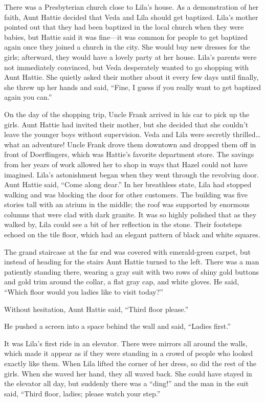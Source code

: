 \documentclass[
  american,
  letterpaper,
]{book}
\begin{document}
There was a Presbyterian church close to Lila's house. As a
demonstration of her faith, Aunt Hattie decided that Veda and Lila
should get baptized. Lila's mother pointed out that they had been
baptized in the local church when they were babies, but Hattie said it
was fine---it was common for people to get baptized again once they
joined a church in the city. She would buy new dresses for the girls;
afterward, they would have a lovely party at her house. Lila's parents
were not immediately convinced, but Veda desperately wanted to go
shopping with Aunt Hattie. She quietly asked their mother about it every
few days until finally, she threw up her hands and said, ``Fine, I guess
if you really want to get baptized again you can.''

On the day of the shopping trip, Uncle Frank arrived in his car to pick
up the girls. Aunt Hattie had invited their mother, but she decided that
she couldn't leave the younger boys without supervision. Veda and Lila
were secretly thrilled\ldots what an adventure! Uncle Frank drove them
downtown and dropped them off in front of Doerflingers, which was
Hattie's favorite department store. The savings from her years of work
allowed her to shop in ways that Hazel could not have imagined. Lila's
astonishment began when they went through the revolving door. Aunt
Hattie said, ``Come along dear.'' In her breathless state, Lila had
stopped walking and was blocking the door for other customers. The
building was five stories tall with an atrium in the middle; the roof
was supported by enormous columns that were clad with dark granite. It
was so highly polished that as they walked by, Lila could see a bit of
her reflection in the stone. Their footsteps echoed on the tile floor,
which had an elegant pattern of black and white squares.

The grand staircase at the far end was covered with emerald-green
carpet, but instead of heading for the stairs Aunt Hattie turned to the
left. There was a man patiently standing there, wearing a gray suit with
two rows of shiny gold buttons and gold trim around the collar, a flat
gray cap, and white gloves. He said, ``Which floor would you ladies like
to visit today?''

Without hesitation, Aunt Hattie said, ``Third floor please.''

He pushed a screen into a space behind the wall and said, ``Ladies
first.''

It was Lila's first ride in an elevator. There were mirrors all around
the walls, which made it appear as if they were standing in a crowd of
people who looked exactly like them. When Lila lifted the corner of her
dress, so did the rest of the girls. When she waved her hand, they all
waved back. She could have stayed in the elevator all day, but suddenly
there was a ``ding!'' and the man in the suit said, ``Third floor,
ladies; please watch your step.''
\end{document}
